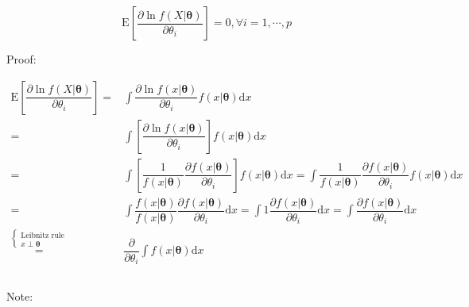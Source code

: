 \documentclass[
]{book}
\theoremstyle{definition}
\theoremstyle{definition}
\theoremstyle{definition}
\theoremstyle{definition}
\theoremstyle{remark}
\begin{document}
\[
\mathrm{E}\left[\dfrac{\partial\ln f\left(X|\boldsymbol{\theta}\right)}{\partial\theta_{{\scriptscriptstyle i}}}\right]=0,\forall i=1,\cdots,p
\]

Proof:

\[
\begin{aligned}
\mathrm{E}\left[\dfrac{\partial\ln f\left(X|\boldsymbol{\theta}\right)}{\partial\theta_{{\scriptscriptstyle i}}}\right]= & \int\dfrac{\partial\ln f\left(x|\boldsymbol{\theta}\right)}{\partial\theta_{{\scriptscriptstyle i}}}f\left(x|\boldsymbol{\theta}\right)\mathrm{d}x\\
= & \int\left[\dfrac{\partial\ln f\left(x|\boldsymbol{\theta}\right)}{\partial\theta_{{\scriptscriptstyle i}}}\right]f\left(x|\boldsymbol{\theta}\right)\mathrm{d}x\\
= & \int\left[\dfrac{1}{f\left(x|\boldsymbol{\theta}\right)}\dfrac{\partial f\left(x|\boldsymbol{\theta}\right)}{\partial\theta_{{\scriptscriptstyle i}}}\right]f\left(x|\boldsymbol{\theta}\right)\mathrm{d}x=\int\dfrac{1}{f\left(x|\boldsymbol{\theta}\right)}\dfrac{\partial f\left(x|\boldsymbol{\theta}\right)}{\partial\theta_{{\scriptscriptstyle i}}}f\left(x|\boldsymbol{\theta}\right)\mathrm{d}x\\
= & \int\dfrac{f\left(x|\boldsymbol{\theta}\right)}{f\left(x|\boldsymbol{\theta}\right)}\dfrac{\partial f\left(x|\boldsymbol{\theta}\right)}{\partial\theta_{{\scriptscriptstyle i}}}\mathrm{d}x=\int1\dfrac{\partial f\left(x|\boldsymbol{\theta}\right)}{\partial\theta_{{\scriptscriptstyle i}}}\mathrm{d}x=\int\dfrac{\partial f\left(x|\boldsymbol{\theta}\right)}{\partial\theta_{{\scriptscriptstyle i}}}\mathrm{d}x\\
\overset{\begin{cases}
\text{Leibnitz rule}\\
x\perp\boldsymbol{\theta}
\end{cases}}{=} & \dfrac{\partial}{\partial\theta_{{\scriptscriptstyle i}}}\int f\left(x|\boldsymbol{\theta}\right)\mathrm{d}x
\end{aligned}
\]

\[
\tag*{$\Box$}
\]

Note:
\end{document}
